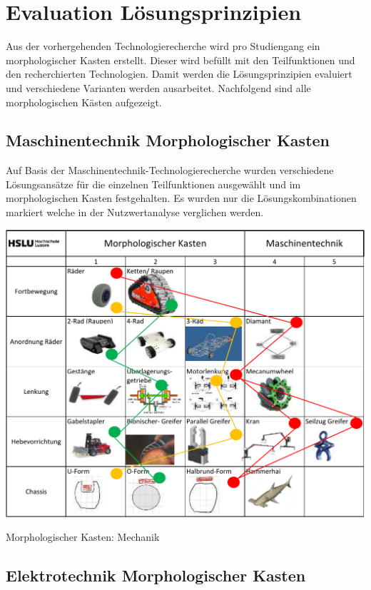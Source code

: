 \section{Evaluation Lösungsprinzipien}

Aus der vorhergehenden Technologierecherche wird pro Studiengang ein morphologischer Kasten erstellt. Dieser wird befüllt mit den Teilfunktionen und den recherchierten Technologien. Damit werden die Lösungsprinzipien evaluiert und verschiedene Varianten werden ausarbeitet. Nachfolgend sind alle morphologischen Kästen aufgezeigt.

\subsection{Maschinentechnik Morphologischer Kasten}

Auf Basis der Maschinentechnik-Technologierecherche wurden verschiedene Lösungsansätze für die einzelnen Teilfunktionen ausgewählt und im morphologischen Kasten festgehalten. Es wurden nur die Lösungskombinationen markiert welche in der Nutzwertanalyse verglichen werden.  

\begin{table}[H]
\centering
\includegraphics[width=\textwidth]{assets/MK_Maschinentechnik.pdf}
\caption{Morphologischer Kasten: Mechanik}
\label{table:mk-mechanik}
\end{table}


\subsection{Elektrotechnik Morphologischer Kasten}

